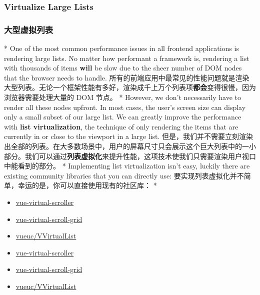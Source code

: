 \begin{paracol}{2}
\subsubsection{Virtualize Large Lists}
\switchcolumn
\subsubsection{大型虚拟列表}
\switchcolumn[0]*%
One of the most common performance issues in all frontend applications
is rendering large lists. No matter how performant a framework is,
rendering a list with thousands of items \textbf{will} be slow due to
the sheer number of DOM nodes that the browser needs to handle.
\switchcolumn
所有的前端应用中最常见的性能问题就是渲染大型列表。无论一个框架性能有多好，渲染成千上万个列表项\textbf{都会}变得很慢，因为浏览器需要处理大量的
DOM 节点。
\switchcolumn[0]*%
However, we don't necessarily have to render all these nodes upfront. In
most cases, the user's screen size can display only a small subset of
our large list. We can greatly improve the performance with \textbf{list
virtualization}, the technique of only rendering the items that are
currently in or close to the viewport in a large list.
\switchcolumn
但是，我们并不需要立刻渲染出全部的列表。在大多数场景中，用户的屏幕尺寸只会展示这个巨大列表中的一小部分。我们可以通过\textbf{列表虚拟化}来提升性能，这项技术使我们只需要渲染用户视口中能看到的部分。
\switchcolumn[0]*%
Implementing list virtualization isn't easy, luckily there are existing
community libraries that you can directly use:
\switchcolumn
要实现列表虚拟化并不简单，幸运的是，你可以直接使用现有的社区库：
\switchcolumn[0]*%
\begin{itemize}
\item
  \href{https://github.com/Akryum/vue-virtual-scroller}{vue-virtual-scroller}
\item
  \href{https://github.com/rocwang/vue-virtual-scroll-grid}{vue-virtual-scroll-grid}
\item
  \href{https://github.com/07akioni/vueuc}{vueuc/VVirtualList}
\end{itemize}
\switchcolumn
\begin{itemize}
\item
  \href{https://github.com/Akryum/vue-virtual-scroller}{vue-virtual-scroller}
\item
  \href{https://github.com/rocwang/vue-virtual-scroll-grid}{vue-virtual-scroll-grid}
\item
  \href{https://github.com/07akioni/vueuc}{vueuc/VVirtualList}
\end{itemize}
\end{paracol}


